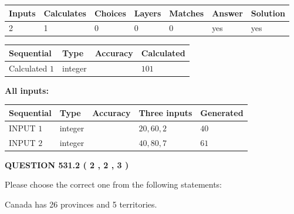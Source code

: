 \documentclass[12pt]{article}
\begin{document}
 

 
   
   
   
   
\noindent\begin{tabular}{|l|l|l|l|l|l|l|}
 \hline
Inputs & Calculates & Choices & Layers & Matches & Answer & Solution \\ \hline
 2  & 
 1  & 
 0
  & 
 0  & 
 0  & 
  yes & 
  yes 
  \\ \hline
 \end{tabular}
   
   
   
   
\noindent{}
   
   
  
  
\noindent\begin{tabular}{|l|l|l|l|}
\hline
 Sequential & Type & Accuracy & Calculated \\ 
\hline
 
 
  Calculated $  1 $ & integer &  & 
  $ 101 $ 
 \\  \hline  
 \end{tabular}
   
   
   
   
\noindent\vspace{0.1in}\hspace{-0.08in} {\textbf{\Large{All inputs: }}}
   
   
  
  
\noindent\begin{tabular}{|l|l|l|l|l|}
\hline
 Sequential & Type & Accuracy & Three inputs & Generated \\ 
\hline
 
 
  INPUT $  1 $ & integer &  & $
 20
 , 
 60
 , 
 2
 $ & $ 40 $ 
 \\  \hline  
 
 
  INPUT $  2 $ & integer &  & $
 40
 , 
 80
 , 
 7
 $ & $ 61 $ 
 \\  \hline  
 \end{tabular}
   
   
  
\vspace{0.2in}
  
{\textbf{\Large{QUESTION
531.2 
 ( 2 , 2 , 3 )
}}}
  
  
Please choose the correct one from the following statements:
 
 
Canada has  26 provinces and  5 territories.
 
\end{document}
